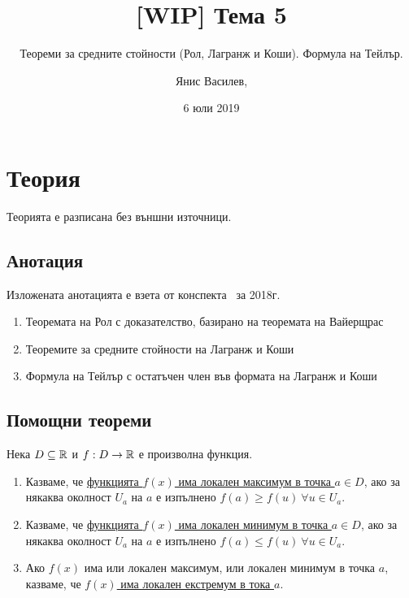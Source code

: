 \documentclass[numbers=endperiod, DIV=15, bibliography=totocnumbered]{scrartcl}
\title{[WIP] Тема 5}
\subtitle{Теореми за средните стойности (Рол, Лагранж и Коши). Формула на Тейлър.}
\author{Янис Василев, \Email{ianis@ivasilev.net}}
\date{6 юли 2019}
\begin{document}
\maketitle

\section{Теория}

Теорията е разписана без външни източници.

\subsection{Анотация}

Изложената анотацията е взета от конспекта~\cite{Syllabus} за 2018г.

\begin{enumerate}
  \item Теоремата на Рол с доказателство, базирано на теоремата на Вайерщрас
  \item Теоремите за средните стойности на Лагранж и Коши
  \item Формула на Тейлър с остатъчен член във формата на Лагранж и Коши
\end{enumerate}

\subsection{Помощни теореми}

\begin{definition}
  Нека $D \subseteq \mathbb{R}$ и $f: D \to \mathbb{R}$ е произволна функция.

  \begin{enumerate}
    \item Казваме, че \uline{функцията $f(x)$ има локален максимум в точка $a \in D$}, ако за някаква околност $U_a$ на $a$ е изпълнено $f(a) \geq f(u)~\forall u \in U_a$.

    \item Казваме, че \uline{функцията $f(x)$ има локален минимум в точка $a \in D$}, ако за някаква околност $U_a$ на $a$ е изпълнено $f(a) \leq f(u)~\forall u \in U_a$.

    \item Ако $f(x)$ има или локален максимум, или локален минимум в точка $a$, казваме, че \uline{$f(x)$ има локален екстремум в тока $a$}.
  \end{enumerate}
\end{definition}
\end{document}
